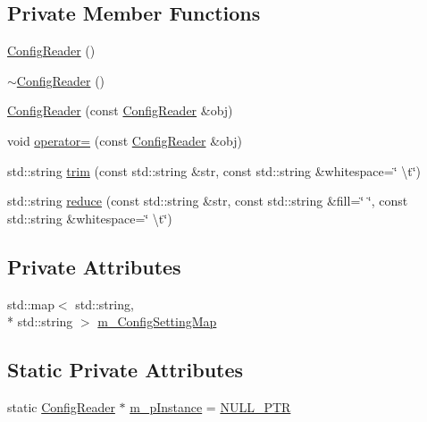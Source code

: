 \subsection*{Private Member Functions}
\begin{DoxyCompactItemize}
\item 
\hyperlink{classcppsecrets_1_1ConfigReader_ac137685c6f48f5090c376aa21619384b}{Config\-Reader} ()
\item 
\hyperlink{classcppsecrets_1_1ConfigReader_a4c4009264e63a116bdc8d5a24ef4142d}{$\sim$\-Config\-Reader} ()
\item 
\hyperlink{classcppsecrets_1_1ConfigReader_afc32de9315bfd707171ca58dca099ffb}{Config\-Reader} (const \hyperlink{classcppsecrets_1_1ConfigReader}{Config\-Reader} \&obj)
\item 
void \hyperlink{classcppsecrets_1_1ConfigReader_aff967772b8a848305fca76c7f9a4380a}{operator=} (const \hyperlink{classcppsecrets_1_1ConfigReader}{Config\-Reader} \&obj)
\item 
std\-::string \hyperlink{classcppsecrets_1_1ConfigReader_a5d2a3e361327288013edad1c215c0674}{trim} (const std\-::string \&str, const std\-::string \&whitespace=\char`\"{} \textbackslash{}t\char`\"{})
\item 
std\-::string \hyperlink{classcppsecrets_1_1ConfigReader_a9c18a4811aa39a774fb1f0fd862d2304}{reduce} (const std\-::string \&str, const std\-::string \&fill=\char`\"{} \char`\"{}, const std\-::string \&whitespace=\char`\"{} \textbackslash{}t\char`\"{})
\end{DoxyCompactItemize}
\subsection*{Private Attributes}
\begin{DoxyCompactItemize}
\item 
std\-::map$<$ std\-::string, \\*
std\-::string $>$ \hyperlink{classcppsecrets_1_1ConfigReader_a67118401e1d2645dfbb29fdd9cce9839}{m\-\_\-\-Config\-Setting\-Map}
\end{DoxyCompactItemize}
\subsection*{Static Private Attributes}
\begin{DoxyCompactItemize}
\item 
static \hyperlink{classcppsecrets_1_1ConfigReader}{Config\-Reader} $\ast$ \hyperlink{classcppsecrets_1_1ConfigReader_ad8eb01c06a1c9cf8b63648816394a82e}{m\-\_\-p\-Instance} = \hyperlink{ConfigReader_8cpp_a530f11a96e508d171d28564c8dc20942}{N\-U\-L\-L\-\_\-\-P\-T\-R}
\end{DoxyCompactItemize}


